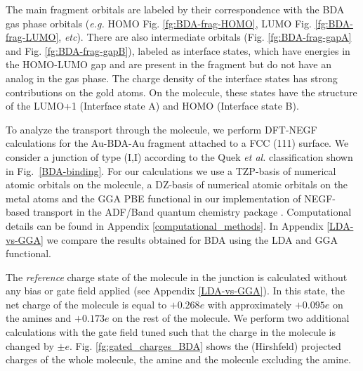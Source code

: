 \documentclass[aip,jcp,a4paper,reprint,floatfix,superscriptaddress]{revtex4-1}
\newcommand{\etal}{\emph{et al.}\xspace}
\newcommand{\eg}{\emph{e.g.}\xspace}
\begin{document}
The main fragment orbitals are labeled by their correspondence with the BDA gas phase orbitals (\eg HOMO Fig. \ref{fg:BDA-frag-HOMO}, LUMO Fig. \ref{fg:BDA-frag-LUMO}, \textit{etc}). There are also intermediate orbitals (Fig. \ref{fg:BDA-frag-gapA} and Fig. \ref{fg:BDA-frag-gapB}), labeled as interface states, which have energies in the HOMO-LUMO gap and are present in the fragment but do not have an analog in the gas phase. The charge density of the interface states has strong contributions on the gold atoms. On the molecule, these states have the structure of the LUMO+1 (Interface state A) and HOMO (Interface state B).



To analyze the transport through the molecule, we perform DFT-NEGF calculations for the Au-BDA-Au fragment attached to a FCC (111) surface. We consider a junction of type (I,I) according to the Quek \etal classification \cite{Quek2007} shown in Fig.~\ref{BDA-binding}. For our calculations we use a TZP-basis of numerical atomic orbitals on the molecule, a DZ-basis of numerical atomic orbitals on the metal atoms and the GGA PBE functional in our implementation of NEGF-based transport in the ADF/Band quantum chemistry package \cite{Velde1991,Wiesenekker1991,Verzijl2012}. Computational details can be found in Appendix \ref{computational_methods}. In Appendix \ref{LDA-vs-GGA} we compare the results obtained for BDA using the LDA and GGA functional.

The \textit{reference} charge state of the molecule in the junction is calculated without any bias or gate field applied (see Appendix \ref{LDA-vs-GGA}). In this state, the net charge of the molecule is equal to $+0.268e$ with approximately $+0.095e$ on the amines and $+0.173e$ on the rest of the molecule. We perform two additional calculations with the gate field tuned such that the charge in the molecule is changed by $\pm e$. Fig. \ref{fg:gated_charges_BDA} shows the (Hirshfeld) projected charges of the whole molecule, the amine and the molecule excluding the amine.
\end{document}

